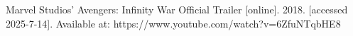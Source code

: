 \documentclass[english]{article}
\begin{document}




		
\begin{thebibliography}{1}
	
	Marvel Studios' Avengers: Infinity War Official Trailer [online]. 2018. [accessed 2025-7-14]. Available at: https://www.youtube.com/watch?v=6ZfuNTqbHE8
	
\end{thebibliography}	
		
\end{document}
